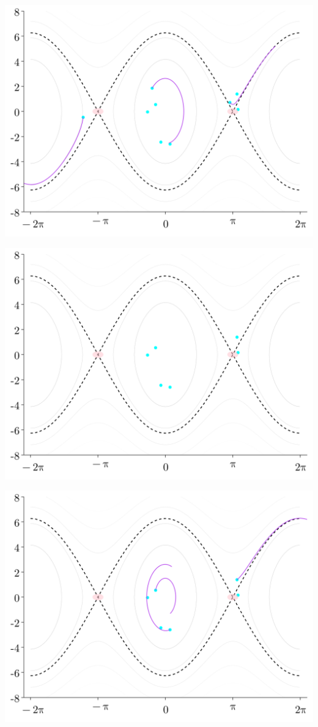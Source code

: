 \documentclass[
]{report}
\begin{document}
\includegraphics{contents/assets/neuralpbc/028.svg}

\includegraphics{contents/assets/neuralpbc/029.svg}

\includegraphics{contents/assets/neuralpbc/030.svg}
\end{document}
